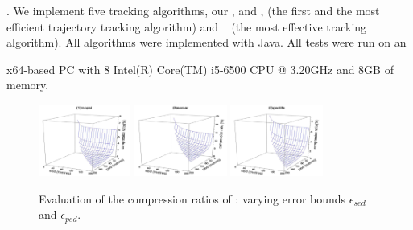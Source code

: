 .
We implement five tracking algorithms, \ie our \citt, \sitt and \bitt, \ldrh \cite{Trajcevski:LDRH} (the first and the most efficient trajectory tracking algorithm) and \grts~\cite{Lange:GRTS,Lange:Tracking} (the most effective tracking algorithm).
All algorithms were implemented with Java.
All tests were run on an {x64-based  PC with 8 Intel(R) Core(TM) i5-6500 CPU @ 3.20GHz and 8GB of memory.
	
	
	


\begin{figure}[tb!]
	\centering
	\includegraphics[width= 0.27\textwidth]{figures/Fig-BITT-mopsi-compression-ratio.png}\hspace{4ex}
	\includegraphics[width= 0.27\textwidth]{figures/Fig-BITT-sercar-compression-ratio.png}\hspace{4ex}
	\includegraphics[width= 0.27\textwidth]{figures/Fig-BITT-geolife-compression-ratio.png}\hspace{0ex}
	\vspace{-1ex}
	\caption{\small Evaluation of the compression ratios of \bitt: varying error bounds $\epsilon_{sed}$ and $\epsilon_{ped}$.}
	\label{fig:bitt-compression-ratio}
	\vspace{-1ex}
\end{figure}


}

